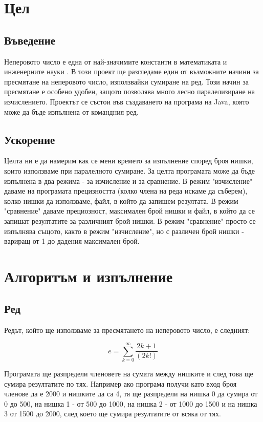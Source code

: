 \chapter{Цел}

\section{Въведение}
Неперовото число е една от най-значимите константи в математиката и инженерните науки \cite{wiki-napier}. В този проект ще разгледаме един от възможните начини за пресмятане на неперовото число, използвайки сумиране на ред. Този начин за пресмятане е особено удобен, защото позволява много лесно паралелизиране на изчислението. Проектът се състои във създаването на програма на Java, която може да бъде изпълнена от командния ред.

\section{Ускорение}
Целта ни е да намерим как се мени времето за изпълнение според броя нишки, които използваме при паралелното сумиране. За целта програмата може да бъде изпълнена в два режима - за изчисление и за сравнение. В режим "изчисление" даваме на програмата прецизността (колко члена на реда искаме да съберем), колко нишки да използваме, файл, в който да запишем резултата. В режим "сравнение" даваме прециозност, максимален брой нишки и файл, в който да се запишат резултатите за различният брой нишки. В режим "сравнение" просто се изпълнява същото, както в режим "изчисление", но с различен брой нишки - вариращ от 1 до дадения максимален брой.


\chapter{Алгоритъм и изпълнение}

\section{Ред}
Редът, който ще използваме за пресмятането на неперовото число, е следният:

\[ e = \sum_{k = 0}^{\infty} \frac{2k + 1}{(2k!)} \]

Програмата ще разпредели членовете на сумата между нишките и след това ще сумира резултатите по тях. Например ако програма получи като вход броя членове да е 2000 и нишките да са 4, тя ще разпредели на нишка 0 да сумира от 0 до 500, на нишка 1 - от 500 до 1000, на нишка 2 - от 1000 до 1500 и на нишка 3 от 1500 до 2000, след което ще сумира резултатите от всяка от тях.


